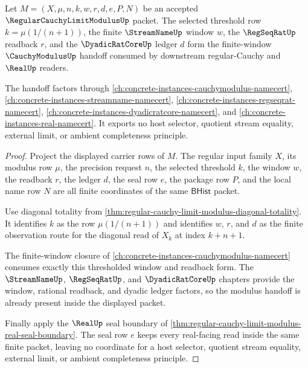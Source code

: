 \begin{theorem}
\label{thm:regular-cauchy-limit-modulus-tail-modulus-extraction}
Let $M=(X,\mu,n,k,w,r,d,e,P,N)$ be an accepted $\RegularCauchyLimitModulusUp$ packet. The selected threshold row $k=\mu(1/(n+1))$, the finite $\StreamNameUp$ window $w$, the $\RegSeqRatUp$ readback $r$, and the $\DyadicRatCoreUp$ ledger $d$ form the finite-window $\CauchyModulusUp$ handoff consumed by downstream regular-Cauchy and $\RealUp$ readers.

The handoff factors through \autoref{ch:concrete-instances-cauchymodulus-namecert}, \autoref{ch:concrete-instances-streamname-namecert}, \autoref{ch:concrete-instances-regseqrat-namecert}, \autoref{ch:concrete-instances-dyadicratcore-namecert}, and \autoref{ch:concrete-instances-real-namecert}. It exports no host selector, quotient stream equality, external limit, or ambient completeness principle.
\end{theorem}
\begin{proof}
Project the displayed carrier rows of $M$. The regular input family $X$, its modulus row $\mu$, the precision request $n$, the selected threshold $k$, the window $w$, the readback $r$, the ledger $d$, the seal row $e$, the package row $P$, and the local name row $N$ are all finite coordinates of the same $\mathsf{BHist}$ packet.

Use diagonal totality from \autoref{thm:regular-cauchy-limit-modulus-diagonal-totality}. It identifies $k$ as the row $\mu(1/(n+1))$ and identifies $w$, $r$, and $d$ as the finite observation route for the diagonal read of $X_k$ at index $k+n+1$.

The finite-window closure of \autoref{ch:concrete-instances-cauchymodulus-namecert} consumes exactly this thresholded window and readback form. The $\StreamNameUp$, $\RegSeqRatUp$, and $\DyadicRatCoreUp$ chapters provide the window, rational readback, and dyadic ledger factors, so the modulus handoff is already present inside the displayed packet.

Finally apply the $\RealUp$ seal boundary of \autoref{thm:regular-cauchy-limit-modulus-real-seal-boundary}. The seal row $e$ keeps every real-facing read inside the same finite packet, leaving no coordinate for a host selector, quotient stream equality, external limit, or ambient completeness principle.
\end{proof}

